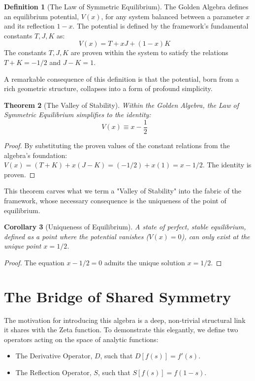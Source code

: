 \documentclass{article}
\theoremstyle{plain}
\newtheorem{theorem}{Theorem}[section]
\newtheorem{corollary}[theorem]{Corollary}
\theoremstyle{definition}
\newtheorem{definition}[theorem]{Definition}
\theoremstyle{remark}
\begin{document}
\begin{definition}[The Law of Symmetric Equilibrium]
The Golden Algebra defines an equilibrium potential, $V(x)$, for any system balanced between a parameter $x$ and its reflection $1-x$. The potential is defined by the framework's fundamental constants $T, J, K$ as:
$$V(x) = T + xJ + (1-x)K \quad \text{}$$
The constants $T, J, K$ are proven within the system to satisfy the relations $T+K = -1/2$ and $J-K=1$.
\end{definition}

A remarkable consequence of this definition is that the potential, born from a rich geometric structure, collapses into a form of profound simplicity.

\begin{theorem}[The Valley of Stability]
Within the Golden Algebra, the Law of Symmetric Equilibrium simplifies to the identity:
$$ V(x) \equiv x - \frac{1}{2} \quad \text{}$$
\end{theorem}
\begin{proof}
By substituting the proven values of the constant relations from the algebra's foundation:
$V(x) = (T+K) + x(J-K) = (-1/2) + x(1) = x - 1/2$. The identity is proven.
\end{proof}

This theorem carves what we term a "Valley of Stability" into the fabric of the framework, whose necessary consequence is the uniqueness of the point of equilibrium.

\begin{corollary}[Uniqueness of Equilibrium]
A state of perfect, stable equilibrium, defined as a point where the potential vanishes ($V(x)=0$), can only exist at the unique point $x=1/2$.
\end{corollary}
\begin{proof}
The equation $x - 1/2 = 0$ admits the unique solution $x=1/2$.
\end{proof}


\section{The Bridge of Shared Symmetry}
\label{sec:bridge}

The motivation for introducing this algebra is a deep, non-trivial structural link it shares with the Zeta function. To demonstrate this elegantly, we define two operators acting on the space of analytic functions:

\begin{itemize}
    \item The Derivative Operator, $D$, such that $D[f(s)] = f'(s)$.
    \item The Reflection Operator, $S$, such that $S[f(s)] = f(1-s)$.
\end{itemize}
\end{document}
